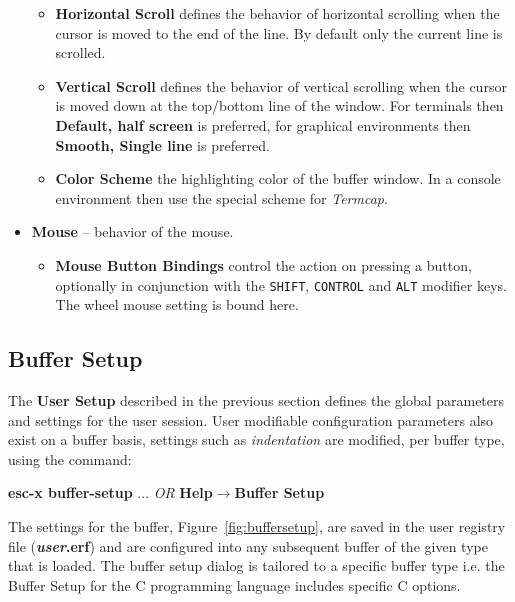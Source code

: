 \documentclass[11pt,a4paper,pdftex]{article}
\begin{document}
\begin{itemize}
\begin{itemize}
      \item \textbf{Horizontal Scroll} defines the behavior of horizontal
      scrolling when the cursor is moved to the end of the line. By default
      only the current line is scrolled.

      \item \textbf{Vertical Scroll} defines the behavior of vertical
      scrolling when the cursor is moved down at the top/bottom line of the
      window. For terminals then \textbf{Default, half screen} is preferred,
      for graphical environments then \textbf{Smooth, Single line} is
      preferred.

      \item \textbf{Color Scheme} the highlighting color of the buffer window.
      In a console environment then use the special scheme for
      \textit{Termcap}.

    \end{itemize}

    \item \textbf{Mouse} -- behavior of the mouse.

    \begin{itemize}

      \item \textbf{Mouse Button Bindings} control the action on pressing a
      button, optionally in conjunction with the \texttt{SHIFT},
      \texttt{CONTROL} and \texttt{ALT} modifier keys. The wheel mouse setting
      is bound here.

    \end{itemize}

  \end{itemize}

\subsection{Buffer Setup}

  The \textbf{User Setup} described in the previous section defines the global
  parameters and settings for the user session. User modifiable configuration
  parameters also exist on a buffer basis, settings such as
  \textit{indentation} are modified, per buffer type, using the command:
  
  \textbf{esc-x buffer-setup} $\dots$ \textit{OR}\newline
  \textbf{Help$\rightarrow$Buffer Setup}
  
  The settings for the buffer, Figure~\ref{fig:buffersetup}, are saved in the
  user registry file (\textbf{\textit{user}.erf}) and are configured into any
  subsequent buffer of the given type that is loaded. The buffer setup dialog
  is tailored to a specific buffer type i.e. the Buffer Setup for the C
  programming language includes specific C options. 
  
\end{document}
